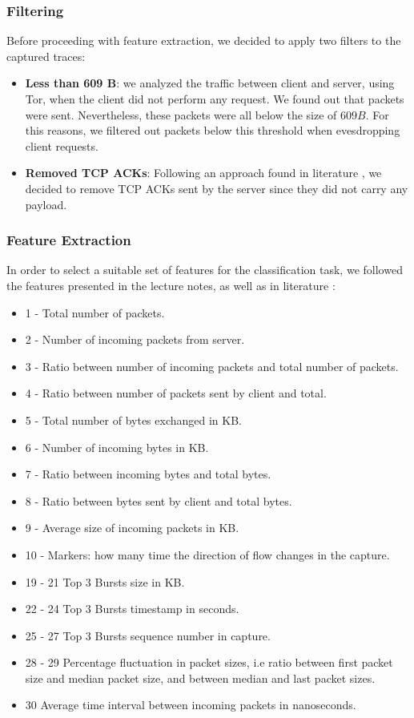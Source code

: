 \documentclass[10pt,conference,compsocconf]{IEEEtran}
\begin{document}
\subsubsection{Filtering}
Before proceeding with feature extraction, we decided to apply two filters to the captured traces:
\begin{itemize}
    \item \textbf{Less than 609 B}: we analyzed the traffic between client and server, using Tor, when the client did not perform any request. We found out that packets were sent. Nevertheless, these packets were all below the size of $609B$. For this reasons, we filtered out packets below this threshold when evesdropping client requests.
    \item \textbf{Removed TCP ACKs}: Following an approach found in literature \cite{web_fingerprinting}, we decided to remove TCP ACKs sent by the server since they did not carry any payload.
\end{itemize}
\subsubsection{Feature Extraction}
In order to select a suitable set of features for the classification task, we followed the features presented in the lecture notes, as well as in literature \cite{web_fingerprinting}:
\begin{itemize}
    \item 1 - Total number of packets.
    \item 2 - Number of incoming packets from server.
    \item 3 - Ratio between number of incoming packets and total number of packets.
    \item 4 - Ratio between number of packets sent by client and total.
    \item 5 - Total number of bytes exchanged in KB.
    \item 6 - Number of incoming bytes in KB.
    \item 7 - Ratio between incoming bytes and total bytes.
    \item 8 - Ratio between bytes sent by client and total bytes.
    \item 9 - Average size of incoming packets in KB.
    \item 10 - Markers: how many time the direction of flow changes in the capture.
    \item 19 - 21 Top 3 Bursts size in KB.
    \item 22 - 24 Top 3 Bursts timestamp in seconds.
    \item 25 - 27 Top 3 Bursts sequence number in capture.
    \item 28 - 29 Percentage fluctuation in packet sizes, i.e ratio between first packet size and median packet size, and between median and last packet sizes.
    \item 30 Average time interval between incoming packets in nanoseconds.
\end{itemize}
\end{document}
